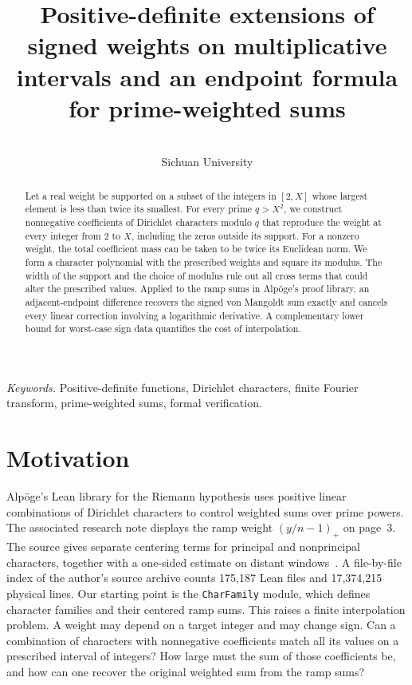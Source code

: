 \documentclass[11pt,a4paper]{article}
\title{Positive-definite extensions of signed weights on multiplicative intervals and an endpoint formula for prime-weighted sums}
\author{\paperAuthor\\[2pt]\small Sichuan University}
\date{}
\begin{document}
\maketitle
\begin{abstract}
Let a real weight be supported on a subset of the integers in $[2,X]$ whose largest element is less than twice its smallest. For every prime $q>X^2$, we construct nonnegative coefficients of Dirichlet characters modulo $q$ that reproduce the weight at every integer from $2$ to $X$, including the zeros outside its support. For a nonzero weight, the total coefficient mass can be taken to be twice its Euclidean norm. We form a character polynomial with the prescribed weights and square its modulus. The width of the support and the choice of modulus rule out all cross terms that could alter the prescribed values. Applied to the ramp sums in Alp\"oge's proof library, an adjacent-endpoint difference recovers the signed von Mangoldt sum exactly and cancels every linear correction involving a logarithmic derivative. A complementary lower bound for worst-case sign data quantifies the cost of interpolation.
\end{abstract}
\noindent\textit{Keywords.} Positive-definite functions, Dirichlet characters, finite Fourier transform, prime-weighted sums, formal verification.

\section{Motivation}
Alp\"oge's Lean library for the Riemann hypothesis uses positive linear combinations of Dirichlet characters to control weighted sums over prime powers. The associated research note displays the ramp weight $(y/n-1)_+$ on page~3. The source gives separate centering terms for principal and nonprincipal characters, together with a one-sided estimate on distant windows~\cite{alpn,alps}. A file-by-file index of the author's source archive counts 175,187 Lean files and 17,374,215 physical lines. Our starting point is the \texttt{CharFamily} module, which defines character families and their centered ramp sums. This raises a finite interpolation problem. A weight may depend on a target integer and may change sign. Can a combination of characters with nonnegative coefficients match all its values on a prescribed interval of integers? How large must the sum of those coefficients be, and how can one recover the original weighted sum from the ramp sums?
\end{document}
